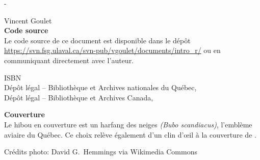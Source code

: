 \begingroup
\calccentering{\unitlength}
\begin{adjustwidth*}{\unitlength}{-\unitlength}
  \setlength{\parindent}{0pt}
  \setlength{\parskip}{\baselineskip}

  {\textcopyright} {\year} Vincent Goulet \\

  

  \sloppy
  \textbf{Code source} \\
  Le code source de ce document est disponible dans le
  dépôt \url{https://svn.fsg.ulaval.ca/svn-pub/vgoulet/documents/intro_r/}
  ou en commu\-ni\-quant directement avec l'auteur.

  \fussy
  ISBN {\ISBN} \\
  Dépôt légal -- Bibliothèque et Archives nationales du Québec, {\year} \\
  Dépôt légal -- Bibliothèque et Archives Canada, {\year}

  \textbf{Couverture} \\
  Le hibou en couverture est un harfang des neiges \emph{(Bubo
    scandiacus)}, l'emblème aviaire du Québec. Ce choix relève
  également d'un clin d'{\oe}il à la couverture de
  \cite{Braun:Rprogramming:2007}.

  Crédits photo: David G.~Hemmings via Wikimedia Commons
\end{adjustwidth*}
\endgroup

